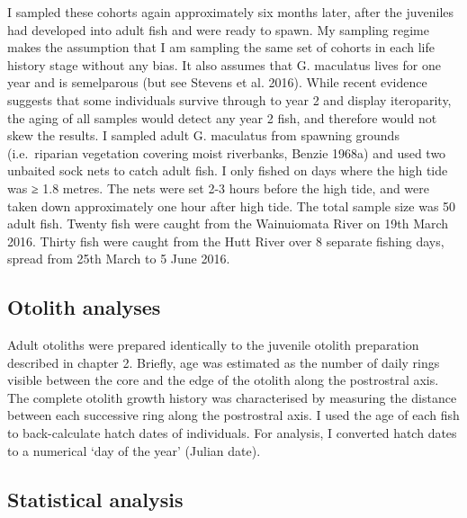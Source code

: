 \documentclass[]{book}
\begin{document}
I sampled these cohorts again approximately six months later, after the
juveniles had developed into adult fish and were ready to spawn. My
sampling regime makes the assumption that I am sampling the same set of
cohorts in each life history stage without any bias. It also assumes
that G. maculatus lives for one year and is semelparous (but see Stevens
et al. 2016). While recent evidence suggests that some individuals
survive through to year 2 and display iteroparity, the aging of all
samples would detect any year 2 fish, and therefore would not skew the
results. I sampled adult G. maculatus from spawning grounds
(i.e.~riparian vegetation covering moist riverbanks, Benzie 1968a) and
used two unbaited sock nets to catch adult fish. I only fished on days
where the high tide was ≥ 1.8 metres. The nets were set 2-3 hours before
the high tide, and were taken down approximately one hour after high
tide. The total sample size was 50 adult fish. Twenty fish were caught
from the Wainuiomata River on 19th March 2016. Thirty fish were caught
from the Hutt River over 8 separate fishing days, spread from 25th March
to 5 June 2016.

\subsection{Otolith analyses}\label{otolith-analyses}

Adult otoliths were prepared identically to the juvenile otolith
preparation described in chapter 2. Briefly, age was estimated as the
number of daily rings visible between the core and the edge of the
otolith along the postrostral axis. The complete otolith growth history
was characterised by measuring the distance between each successive ring
along the postrostral axis. I used the age of each fish to
back-calculate hatch dates of individuals. For analysis, I converted
hatch dates to a numerical `day of the year' (Julian date).

\subsection{Statistical analysis}\label{statistical-analysis-1}
\end{document}
